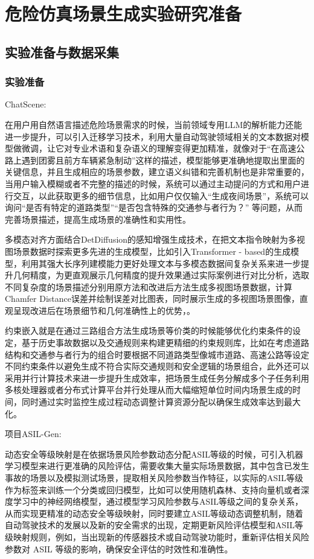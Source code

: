 \chapter{危险仿真场景生成实验研究准备}

\section{实验准备与数据采集}
\subsection{实验准备}

ChatScene:

在用户用自然语言描述危险场景需求的时候，当前领域专用LLM的解析能力还能进一步提升，可以引入迁移学习技术，利用大量自动驾驶领域相关的文本数据对模型做微调，让它对专业术语和复杂语义的理解变得更加精准，就像对于“在高速公路上遇到团雾且前方车辆紧急制动”这样的描述，模型能够更准确地提取出里面的关键信息，并且生成相应的场景参数，建立语义纠错和完善机制也是非常重要的，当用户输入模糊或者不完整的描述的时候，系统可以通过主动提问的方式和用户进行交互，以此获取更多的细节信息，比如用户仅仅输入“生成夜间场景”，系统可以询问“是否有特定的道路类型”“是否包含特殊的交通参与者行为？” 等问题，从而完善场景描述，提高生成场景的准确性和实用性。​


多模态对齐方面结合DetDiffusion的感知增强生成技术，在把文本指令映射为多视图场景数据时探索更多先进的生成模型，比如引入Transformer - based的生成模型，利用其强大长序列建模能力更好处理文本与多模态数据间复杂关系来进一步提升几何精度，为更直观展示几何精度的提升效果通过实际案例进行对比分析，选取不同复杂度的场景描述分别用原方法和改进后方法生成多视图场景数据，计算Chamfer Distance误差并绘制误差对比图表，同时展示生成的多视图场景图像，直观呈现改进后在场景细节和几何准确性上的优势，\cite{zhang2024chatscene}。​


约束嵌入就是在通过三路组合方法生成场景等价类的时候能够优化约束条件的设定，基于历史事故数据以及交通规则来构建更精细的约束规则库，比如在考虑道路结构和交通参与者行为的组合时要根据不同道路类型像城市道路、高速公路等设定不同约束条件以避免生成不符合实际交通规则和安全逻辑的场景组合，此外还可以采用并行计算技术来进一步提升生成效率，把场景生成任务分解成多个子任务利用多核处理器或者分布式计算平台并行处理从而大幅缩短单位时间内场景生成的时间，同时通过实时监控生成过程动态调整计算资源分配以确保生成效率达到最大化。

项目ASIL-Gen:

动态安全等级映射是在依据场景风险参数动态分配ASIL等级的时候，可引入机器学习模型来进行更准确的风险评估，需要收集大量实际场景数据，其中包含已发生事故的场景以及模拟测试场景，提取相关风险参数当作特征，以实际的ASIL等级作为标签来训练一个分类或回归模型，比如可以使用随机森林、支持向量机或者深度学习中的神经网络模型，通过模型学习风险参数与ASIL等级之间的复杂关系，从而实现更精准的动态安全等级映射，同时要建立ASIL等级动态调整机制，随着自动驾驶技术的发展以及新的安全需求的出现，定期更新风险评估模型和ASIL等级映射规则，例如，当出现新的传感器技术或自动驾驶功能时，重新评估相关风险参数对 ASIL 等级的影响，确保安全评估的时效性和准确性。​


